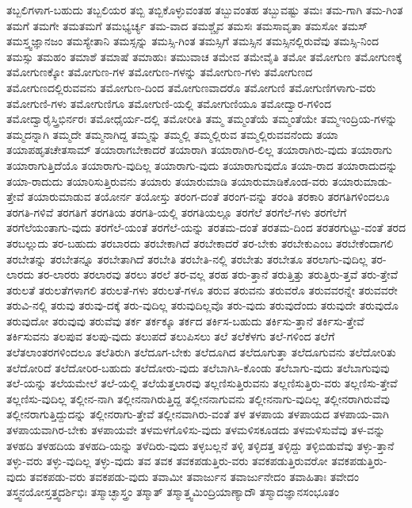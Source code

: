 {ತಬ್ಬಲಿಗಳಾಗ-ಬಹುದು
ತಬ್ಬಲಿಯರ
ತಬ್ಬಿ
ತಬ್ಬಿಕೊಳ್ಳುವಂತಹ
ತಬ್ಬುವಂತಹ
ತಬ್ಬುವಷ್ಟು
ತಮಃ
ತಮ-ಗಾಗಿ
ತಮ-ಗಿಂತ
ತಮಗೆ
ತಮಗೇ
ತಮತಮಗೆ
ತಮಭ್ಯರ್ಚ್ಯ
ತಮ-ವಾದ
ತಮಶ್ಚೈವ
ತಮಸಃ
ತಮಸಾವೃತಾ
ತಮಸೋ
ತಮಸ್
ತಮಸ್ತ್ವಜ್ಞಾನಜಂ
ತಮಸ್ಯೇತಾನಿ
ತಮಸ್ಸನ್ನು
ತಮಸ್ಸಿ-ಗಿಂತ
ತಮಸ್ಸಿಗೆ
ತಮಸ್ಸಿನ
ತಮಸ್ಸಿನಲ್ಲಿರುವೆವು
ತಮಸ್ಸಿ-ನಿಂದ
ತಮಸ್ಸು
ತಮಹಂ
ತಮಾಶೆ
ತಮಾಷೆ
ತಮಾಹುಃ
ತಮುವಾಚ
ತಮೇವ
ತಮೇವೈತಿ
ತಮೋ
ತಮೋಗುಣ
ತಮೋಗುಣಕ್ಕೆ
ತಮೋಗುಣಕ್ಕೋ
ತಮೋಗುಣ-ಗಳ
ತಮೋಗುಣ-ಗಳನ್ನು
ತಮೋಗುಣ-ಗಳು
ತಮೋಗುಣದ
ತಮೋಗುಣದಲ್ಲಿರುವವನು
ತಮೋಗುಣ-ದಿಂದ
ತಮೋಗುಣವಾದರೊ
ತಮೋಗುಣಿ
ತಮೋಗುಣಿಗಳಾಗು-ವರು
ತಮೋಗುಣಿ-ಗಳು
ತಮೋಗುಣಿಗೂ
ತಮೋಗುಣಿ-ಯಲ್ಲಿ
ತಮೋಗುಣಿಯೂ
ತಮೋದ್ವಾರ-ಗಳಿಂದ
ತಮೋದ್ವಾರೈಸ್ತ್ರಿಭಿರ್ನರಃ
ತಮೋಧೈರ್ಯ-ದಲ್ಲಿ
ತಮೋರೀತಿ
ತಮ್ಮ
ತಮ್ಮಂತೆಯೆ
ತಮ್ಮಂತೆಯೇ
ತಮ್ಮಇಂದ್ರಿಯ-ಗಳನ್ನು
ತಮ್ಮದನ್ನಾಗಿ
ತಮ್ಮದೇ
ತಮ್ಮನಾಗಿದ್ದ
ತಮ್ಮನ್ನು
ತಮ್ಮಲ್ಲಿ
ತಮ್ಮಲ್ಲಿರುವ
ತಮ್ಮಲ್ಲಿರುವವನೆಂದು
ತಯಾ
ತಯಾಪಹೃತಚೇತಸಾಮ್
ತಯಾರಾಗಬೇಕಾದರೆ
ತಯಾರಾಗಿ
ತಯಾರಾಗಿರ-ಲಿಲ್ಲ
ತಯಾರಾಗಿರು-ವುದು
ತಯಾರಾಗು
ತಯಾರಾಗುತ್ತಿದೆಯೊ
ತಯಾರಾಗು-ವುದಿಲ್ಲ
ತಯಾರಾಗು-ವುದು
ತಯಾರಾಗುವುದೊ
ತಯಾ-ರಾದ
ತಯಾರಾದುದನ್ನು
ತಯಾ-ರಾದುದು
ತಯಾರಿಸುತ್ತಿರುವನು
ತಯಾರು
ತಯಾರುಮಾಡಿ
ತಯಾರುಮಾಡಿಕೊಂಡ-ವರು
ತಯಾರುಮಾಡು-ತ್ತೇವೆ
ತಯಾರುಮಾಡುವ
ತಯೋರ್ನ
ತಯೋಸ್ತು
ತರಂಗ-ದಂತೆ
ತರಂಗ-ವನ್ನು
ತರಂತಿ
ತರಕಾರಿ
ತರಗತಿಗಳಿಂದಲೂ
ತರಗತಿ-ಗಳಿವೆ
ತರಗತಿಗೆ
ತರಗತಿಯ
ತರಗತಿ-ಯಲ್ಲಿ
ತರಗತಿಯಲ್ಲೂ
ತರಗೆಲೆ
ತರಗೆಲೆ-ಗಳು
ತರಗೆಲೆಗೆ
ತರಗೆಲೆಯಂತಾಗು-ವುದು
ತರಗೆಲೆ-ಯಂತೆ
ತರಗೆಲೆ-ಯನ್ನು
ತರತಮ-ದಂತೆ
ತರತಮ-ದಿಂದ
ತರತರಗುಟ್ಟು-ವಂತೆ
ತರದ
ತರಬಲ್ಲುದು
ತರ-ಬಹುದು
ತರಬಾರದು
ತರಬೇಕಾಗಿದೆ
ತರಬೇಕಾದರೆ
ತರ-ಬೇಕು
ತರಬೇಕುಎಂಬ
ತರಬೇಕೆಂದಾಗಲಿ
ತರಬೇತನ್ನು
ತರಬೇತನ್ನೂ
ತರಬೇತಾಗಿದೆ
ತರಬೇತಿ
ತರಬೇತಿ-ನಲ್ಲಿ
ತರಬೇತು
ತರಬೇತೂ
ತರಲಾಗು-ವುದಿಲ್ಲ
ತರ-ಲಾರದು
ತರ-ಲಾರರು
ತರಲಾರವು
ತರಲು
ತರಲೆ
ತರ-ವಲ್ಲ
ತರಹ
ತರು-ತ್ತಾನೆ
ತರುತ್ತಿತ್ತು
ತರುತ್ತಿರು-ತ್ತವೆ
ತರು-ತ್ತೇವೆ
ತರುಲತೆ
ತರುಲತೆಗಳಾಗಲಿ
ತರುಲತೆ-ಗಳು
ತರುಲತೆ-ಗಳೂ
ತರುವ
ತರುವನು
ತರುವರೊ
ತರುವವರನ್ನೇ
ತರುವವರೇ
ತರುವಿ-ನಲ್ಲಿ
ತರುವು
ತರುವು-ದಕ್ಕೆ
ತರು-ವುದಿಲ್ಲ
ತರುವುದಿಲ್ಲವೊ
ತರು-ವುದು
ತರುವುದೆಂದು
ತರುವುದೇ
ತರುವುದೊ
ತರುವುದೋ
ತರುವುವು
ತರುವೆವು
ತರ್ಕ
ತರ್ಕಕ್ಕೂ
ತರ್ಕದ
ತರ್ಕಿಸ-ಬಹುದು
ತರ್ಕಿಸು-ತ್ತಾನೆ
ತರ್ಕಿಸು-ತ್ತೇವೆ
ತರ್ಕಿಸುವನು
ತಲಪುವ
ತಲಪು-ವುದು
ತಲುಪದೆ
ತಲುಪಿಸಲು
ತಲೆ
ತಲೆಕೆಳಗು
ತಲೆ-ಗಳಿಂದ
ತಲೆಗೆ
ತಲೆತಲಾಂತರಗಳಿಂದಲೂ
ತಲೆತಿರುಗಿ
ತಲೆದೂಗ-ಬೇಕು
ತಲೆದೂಗಿದ
ತಲೆದೂಗುತ್ತಾ
ತಲೆದೂಗುವನು
ತಲೆದೋರಿತು
ತಲೆದೋರಿದೆ
ತಲೆದೋರಿರ-ಬಹುದು
ತಲೆದೋರು-ವುದು
ತಲೆಬಾಗಿಸಿ-ಕೊಂಡು
ತಲೆಬಾಗು-ವುದು
ತಲೆಬಾಗುವುವು
ತಲೆ-ಯನ್ನು
ತಲೆಯಮೇಲೆ
ತಲೆ-ಯಲ್ಲಿ
ತಲೆಯೆತ್ತಲಾರವು
ತಲ್ಲಣಿಸುತ್ತಿರುವನು
ತಲ್ಲಣಿಸುತ್ತಿರು-ವರು
ತಲ್ಲಣಿಸು-ತ್ತೇವೆ
ತಲ್ಲಣಿಸು-ವುದಿಲ್ಲ
ತಲ್ಲೀನ-ನಾಗಿ
ತಲ್ಲೀನನಾಗಿರುತ್ತಿದ್ದ
ತಲ್ಲೀನನಾಗುವನು
ತಲ್ಲೀನನಾಗು-ವುದಿಲ್ಲ
ತಲ್ಲೀನರಾಗಿರುವೆವು
ತಲ್ಲೀನರಾಗುತ್ತಿದ್ದುದನ್ನು
ತಲ್ಲೀನರಾಗು-ತ್ತೇವೆ
ತಲ್ಲೀನವಾಗಿರು-ವಂತೆ
ತಳ
ತಳಪಾಯ
ತಳಪಾಯದ
ತಳಪಾಯ-ವಾಗಿ
ತಳಪಾಯವಾಗಿರ-ಬೇಕು
ತಳಪಾಯವೇ
ತಳಮಳಗೊಳಿಸು-ವುದು
ತಳಮಳಿಸಕೂಡದು
ತಳಮಳಿಸುವೆವು
ತಳ-ವನ್ನು
ತಳಹದಿ
ತಳಹದಿಯ
ತಳಹದಿ-ಯನ್ನು
ತಳೆದಿರು-ವುದು
ತಳ್ಳಬಲ್ಲನೆ
ತಳ್ಳಿ
ತಳ್ಳಿದತ್ತ
ತಳ್ಳಿದ್ದು
ತಳ್ಳಿಬಿಡುವೆವು
ತಳ್ಳು-ತ್ತಾನೆ
ತಳ್ಳು-ವರು
ತಳ್ಳು-ವುದಿಲ್ಲ
ತಳ್ಳು-ವುದು
ತವ
ತವಕ
ತವಕಪಡುತ್ತಿರು-ವರು
ತವಕಪಡುತ್ತಿರುವರೋ
ತವಕಪಡುತ್ತಿರು-ವುದು
ತವಕಪಡು-ವರು
ತವಕಪಡು-ವುದು
ತವಾಮೀ
ತವಾರ್ಜುನ
ತವಾರ್ಜುನೇದಂ
ತವಾಹಿತಾಃ
ತವೇದಂ
ತಸ್ತ್ವನಯೋಸ್ತತ್ತ್ವದರ್ಶಿಭಿಃ
ತಸ್ಮಾಚ್ಛಾಸ್ತ್ರಂ
ತಸ್ಮಾತ್
ತಸ್ಮಾತ್ತ್ವಮಿಂದ್ರಿಯಾಣ್ಯಾದೌ
ತಸ್ಮಾದಜ್ಞಾನಸಂಭೂತಂ
}
